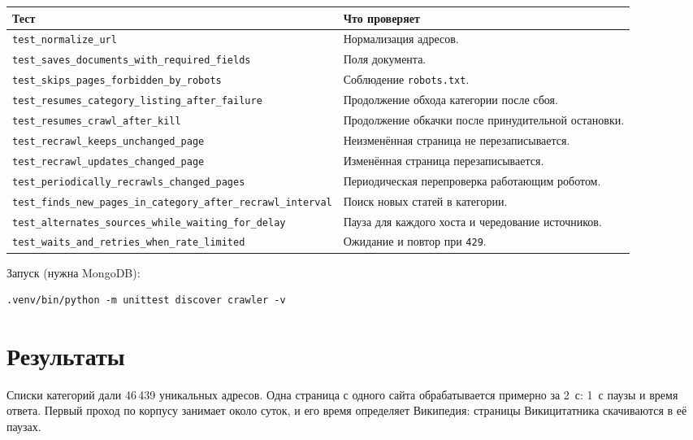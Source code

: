 \documentclass[12pt,a4paper,oneside,fleqn]{article}
\begin{document}
\begin{longtable}{|p{6.8cm}|p{8.2cm}|}
\hline
\textbf{Тест} & \textbf{Что проверяет} \\
\hline
\texttt{test\_normalize\_url} & Нормализация адресов. \\
\hline
\texttt{test\_saves\_documents\_with\_\allowbreak{}required\_fields} & Поля документа. \\
\hline
\texttt{test\_skips\_pages\_forbidden\_\allowbreak{}by\_robots} & Соблюдение \texttt{robots.txt}. \\
\hline
\texttt{test\_resumes\_category\_listing\_\allowbreak{}after\_failure} & Продолжение обхода категории после сбоя. \\
\hline
\texttt{test\_resumes\_crawl\_after\_kill} & Продолжение обкачки после принудительной остановки. \\
\hline
\texttt{test\_recrawl\_keeps\_unchanged\_\allowbreak{}page} & Неизменённая страница не перезаписывается. \\
\hline
\texttt{test\_recrawl\_updates\_changed\_\allowbreak{}page} & Изменённая страница перезаписывается. \\
\hline
\texttt{test\_periodically\_recrawls\_\allowbreak{}changed\_pages} & Периодическая перепроверка работающим роботом. \\
\hline
\texttt{test\_finds\_new\_pages\_in\_\allowbreak{}category\_after\_recrawl\_interval} & Поиск новых статей в категории. \\
\hline
\texttt{test\_alternates\_sources\_while\_\allowbreak{}waiting\_for\_delay} & Пауза для каждого хоста и чередование источников. \\
\hline
\texttt{test\_waits\_and\_retries\_when\_\allowbreak{}rate\_limited} & Ожидание и повтор при \texttt{429}. \\
\hline
\end{longtable}

Запуск (нужна MongoDB):

\begin{lstlisting}[style=plaintext]
.venv/bin/python -m unittest discover crawler -v
\end{lstlisting}

\pagebreak

\section{Результаты}

Списки категорий дали 46\,439 уникальных адресов. Одна страница с одного сайта обрабатывается примерно за 2~с: 1~с паузы и время ответа. Первый проход по корпусу занимает около суток, и его время определяет Википедия: страницы Викицитатника скачиваются в её паузах.
\end{document}
